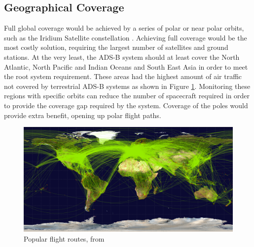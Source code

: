 \subsection{Geographical Coverage}
Full global coverage would be achieved by a series of polar or near polar orbits, such as the Iridium Satellite constellation \cite{iridium_ICAO_man,iridium:an_overview1998}. Achieving full coverage would be the most costly solution, requiring the largest number of satellites and ground stations. At the very least, the ADS-B system should at least cover the North Atlantic, North Pacific and Indian Oceans and South East Asia in order to meet the root system requirement. These areas had the highest amount of air traffic not covered by terrestrial ADS-B systems as shown in Figure \ref{fig:flightpaths}. Monitoring these regions with specific orbits can reduce the number of spacecraft required in order to provide the coverage gap required by the system. Coverage of the poles would provide extra benefit, opening up polar flight paths.
\begin{figure}[htbpp]
	\centering
	\includegraphics[scale = 0.18]{Pictures/flightpaths.png}
	
	\caption[Popular flight routes]{Popular flight routes, from \cite{Open}}
	\label{fig:flightpaths}
\end{figure} 



